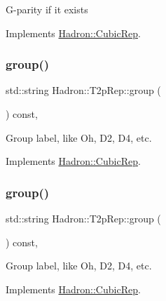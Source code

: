 G-\/parity if it exists 

Implements \mbox{\hyperlink{structHadron_1_1CubicRep_a52104e43266d1614c00bbd1c3b395458}{Hadron\+::\+Cubic\+Rep}}.

\mbox{\label{structHadron_1_1T2pRep_a880ce85ebd0b9fe1feddf9addc9a6cc3}} 
\subsubsection{\texorpdfstring{group()}{group()}\hspace{0.1cm}{\footnotesize\ttfamily [1/2]}}
{\footnotesize\ttfamily std\+::string Hadron\+::\+T2p\+Rep\+::group (\begin{DoxyParamCaption}{ }\end{DoxyParamCaption}) const\hspace{0.3cm}{\ttfamily [inline]}, {\ttfamily [virtual]}}

Group label, like Oh, D2, D4, etc. 

Implements \mbox{\hyperlink{structHadron_1_1CubicRep_a0748f11ec87f387062c8e8981339a29c}{Hadron\+::\+Cubic\+Rep}}.

\mbox{\label{structHadron_1_1T2pRep_a880ce85ebd0b9fe1feddf9addc9a6cc3}} 
\subsubsection{\texorpdfstring{group()}{group()}\hspace{0.1cm}{\footnotesize\ttfamily [2/2]}}
{\footnotesize\ttfamily std\+::string Hadron\+::\+T2p\+Rep\+::group (\begin{DoxyParamCaption}{ }\end{DoxyParamCaption}) const\hspace{0.3cm}{\ttfamily [inline]}, {\ttfamily [virtual]}}

Group label, like Oh, D2, D4, etc. 

Implements \mbox{\hyperlink{structHadron_1_1CubicRep_a0748f11ec87f387062c8e8981339a29c}{Hadron\+::\+Cubic\+Rep}}.

\mbox{\label{structHadron_1_1T2pRep_abf712164cb437c03107c2467574b32c1}} 

